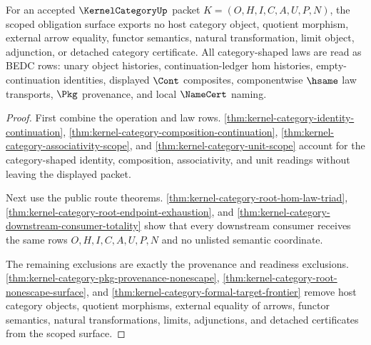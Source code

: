 \begin{theorem}
\label{thm:kernel-category-scoped-nonescape-surface}
For an accepted $\KernelCategoryUp$ packet $K=(O,H,I,C,A,U,P,N)$, the scoped obligation surface exports no host category object, quotient morphism, external arrow equality, functor semantics, natural transformation, limit object, adjunction, or detached category certificate. All category-shaped laws are read as BEDC rows: unary object histories, continuation-ledger hom histories, empty-continuation identities, displayed $\Cont$ composites, componentwise $\hsame$ law transports, $\Pkg$ provenance, and local $\NameCert$ naming.
\end{theorem}
\begin{proof}
First combine the operation and law rows. \autoref{thm:kernel-category-identity-continuation}, \autoref{thm:kernel-category-composition-continuation}, \autoref{thm:kernel-category-associativity-scope}, and \autoref{thm:kernel-category-unit-scope} account for the category-shaped identity, composition, associativity, and unit readings without leaving the displayed packet.

Next use the public route theorems. \autoref{thm:kernel-category-root-hom-law-triad}, \autoref{thm:kernel-category-root-endpoint-exhaustion}, and \autoref{thm:kernel-category-downstream-consumer-totality} show that every downstream consumer receives the same rows $O,H,I,C,A,U,P,N$ and no unlisted semantic coordinate.

The remaining exclusions are exactly the provenance and readiness exclusions. \autoref{thm:kernel-category-pkg-provenance-nonescape}, \autoref{thm:kernel-category-root-nonescape-surface}, and \autoref{thm:kernel-category-formal-target-frontier} remove host category objects, quotient morphisms, external equality of arrows, functor semantics, natural transformations, limits, adjunctions, and detached certificates from the scoped surface.
\end{proof}

